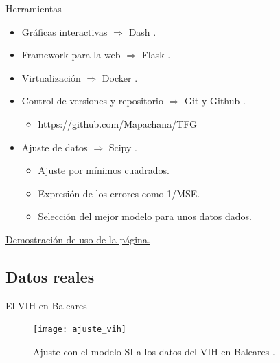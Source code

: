 \begin{frame}{Herramientas}

    \begin{itemize}
        \item Gráficas interactivas $\Rightarrow$ Dash \cite{dash}.
        \pause
        \item Framework para la web $\Rightarrow$ Flask \cite{flask}.
        \pause
        \item Virtualización $\Rightarrow$ Docker \cite{docker}.
        \pause
        \item Control de versiones y repositorio $\Rightarrow$ Git y Github \cite{git}.
        \begin{itemize}
            \item \href{https://github.com/Mapachana/TFG}{https://github.com/Mapachana/TFG}
        \end{itemize}
        \pause
        \item Ajuste de datos $\Rightarrow$ Scipy \cite{scipy_curvefit}.
        \begin{itemize}
            \item Ajuste por mínimos cuadrados.
            \item Expresión de los errores como 1/MSE.
            \item Selección del mejor modelo para unos datos dados.
        \end{itemize}
    \end{itemize}

    \pause

    \href{run:/home/mapachana/2022-06-23 19-38-25.mkv}{Demostración de uso de la página.}

\end{frame}


\subsection{Datos reales}


\begin{frame}{El VIH en Baleares}

    \begin{figure}
        \begin{center}
        \caption{Ajuste con el modelo SI a los datos del VIH en Baleares \cite{datos_vih}.}
        \label{ajuste_vih}
        \texttt{[image: ajuste\_vih]}
        \end{center}
        \end{figure}
\end{frame}


